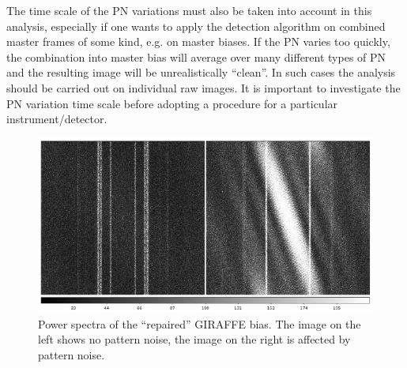 The time scale of the PN variations must also be taken into account in this 
analysis, especially if one wants to apply the detection algorithm on 
combined master frames of some kind, e.g. on master biases. If the 
PN varies too quickly, the combination into master bias will average 
over many different types of PN and the resulting image will be 
unrealistically ``clean''. In such cases the analysis should be 
carried out on individual raw images. It is important to investigate 
the PN variation time scale before adopting a procedure for a 
particular instrument/detector.


\begin{figure}[H]
  \centering \subfigure
  \includegraphics[width=12.0cm]{figures/patternnoise_giraffe-repair_powerSpectra.png} 
  \caption[]{\footnotesize Power spectra of the ``repaired'' GIRAFFE bias. 
  The image on the left shows no pattern noise, the image on the right is 
  affected by pattern noise.}
  \label{fig:patternnoise_giraffe_repair_powerSpectra}
\end{figure}

% 
% 
